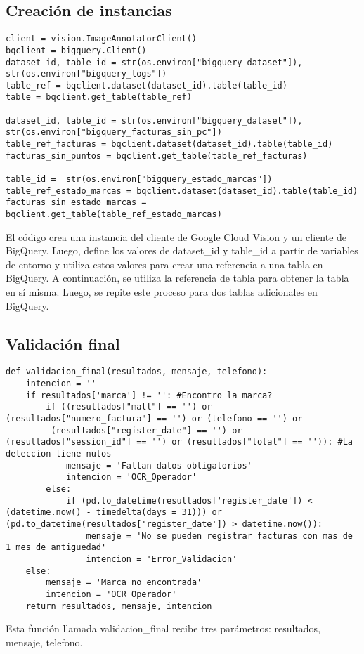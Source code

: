 \documentclass{article}
\begin{document}
\subsection{Creación de instancias}
\begin{lstlisting}
client = vision.ImageAnnotatorClient()
bqclient = bigquery.Client()
dataset_id, table_id = str(os.environ["bigquery_dataset"]), str(os.environ["bigquery_logs"])
table_ref = bqclient.dataset(dataset_id).table(table_id)
table = bqclient.get_table(table_ref)

dataset_id, table_id = str(os.environ["bigquery_dataset"]), str(os.environ["bigquery_facturas_sin_pc"])
table_ref_facturas = bqclient.dataset(dataset_id).table(table_id)
facturas_sin_puntos = bqclient.get_table(table_ref_facturas)

table_id =  str(os.environ["bigquery_estado_marcas"])
table_ref_estado_marcas = bqclient.dataset(dataset_id).table(table_id)
facturas_sin_estado_marcas = bqclient.get_table(table_ref_estado_marcas)
\end{lstlisting}
El código crea una instancia del cliente de Google Cloud Vision
y un cliente de BigQuery. Luego, define los valores de dataset\_id y table\_id a partir de variables de entorno y utiliza estos valores para crear una referencia a una tabla en BigQuery.
A continuación, se utiliza la referencia de tabla para obtener la tabla en sí misma. Luego, se repite este proceso para dos tablas adicionales en BigQuery.

\subsection{Validación final}
\begin{lstlisting}
def validacion_final(resultados, mensaje, telefono):
    intencion = ''
    if resultados['marca'] != '': #Encontro la marca?
        if ((resultados["mall"] == '') or (resultados["numero_factura"] == '') or (telefono == '') or
         (resultados["register_date"] == '') or (resultados["session_id"] == '') or (resultados["total"] == '')): #La deteccion tiene nulos
            mensaje = 'Faltan datos obligatorios'
            intencion = 'OCR_Operador'
        else:
            if (pd.to_datetime(resultados['register_date']) < (datetime.now() - timedelta(days = 31))) or (pd.to_datetime(resultados['register_date']) > datetime.now()):
                mensaje = 'No se pueden registrar facturas con mas de 1 mes de antiguedad'
                intencion = 'Error_Validacion'
    else:
        mensaje = 'Marca no encontrada'
        intencion = 'OCR_Operador'
    return resultados, mensaje, intencion  
\end{lstlisting}
Esta función llamada validacion\_final recibe tres parámetros: resultados, mensaje, telefono.
\end{document}
